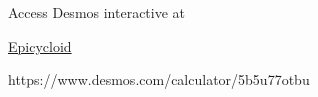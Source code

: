 \documentclass{ximera}
\begin{document}
\begin{exploration}
Access Desmos interactive at
 
\href{https://www.desmos.com/calculator/5b5u77otbu}{Epicycloid}

 
\begin{onlineOnly}
    \begin{center}
\end{center}
\end{onlineOnly}

https://www.desmos.com/calculator/5b5u77otbu


\end{exploration}
\end{document}
